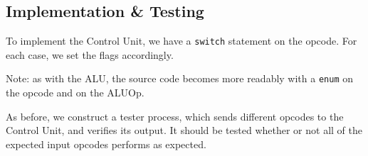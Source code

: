 \documentclass{beamer}
\begin{document}
\subsection{Implementation \& Testing}
\begin{frame}
    To implement the Control Unit, we have a \texttt{switch} statement on the
    opcode. For each case, we set the flags accordingly.

    \vspace{\baselineskip}
    Note: as with the ALU, the source code becomes more readably with a
    \texttt{enum} on the opcode and on the ALUOp.

    \vspace{\baselineskip}
    As before, we construct a tester process, which sends different opcodes to
    the Control Unit, and verifies its output. It should be tested whether or
    not all of the expected input opcodes performs as expected.
\end{frame}
\end{document}
